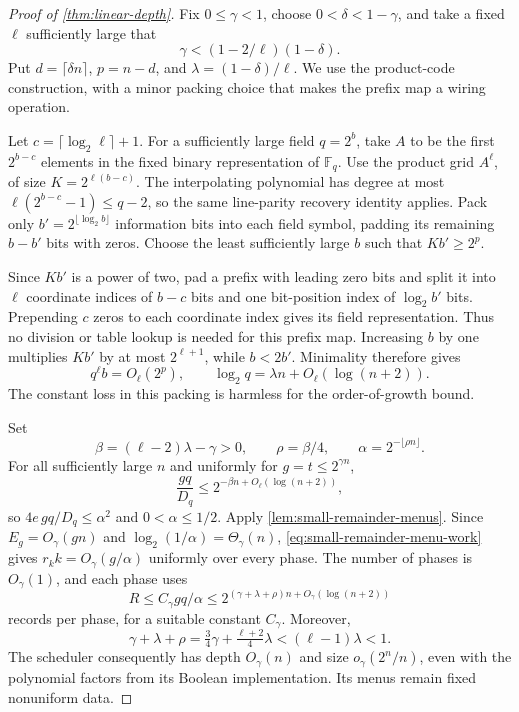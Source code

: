 \documentclass[11pt]{article}
\newcommand{\F}{\mathbb{F}}
\begin{document}
\begin{proof}[Proof of \cref{thm:linear-depth}]
Fix $0\le\gamma<1$, choose $0<\delta<1-\gamma$, and take a fixed
$\ell$ sufficiently large that
\[
  \gamma<(1-2/\ell)(1-\delta).
\]
Put $d=\lceil\delta n\rceil$, $p=n-d$, and
$\lambda=(1-\delta)/\ell$.  We use the product-code construction, with
a minor packing choice that makes the prefix map a wiring operation.

Let $c=\lceil\log_2\ell\rceil+1$.  For a sufficiently large field
$q=2^b$, take $A$ to be the first $2^{b-c}$ elements in the fixed binary
representation of $\F_q$.  Use the product grid $A^\ell$, of size
$K=2^{\ell(b-c)}$.  The interpolating polynomial has degree at most
$\ell(2^{b-c}-1)\le q-2$, so the same line-parity recovery identity
applies.  Pack only $b'=2^{\lfloor\log_2 b\rfloor}$ information bits
into each field symbol, padding its remaining $b-b'$ bits with zeros.
Choose the least sufficiently large $b$ such that $Kb'\ge2^p$.

Since $Kb'$ is a power of two, pad a prefix with leading zero bits
and split it into $\ell$ coordinate indices of $b-c$ bits and one
bit-position index of $\log_2b'$ bits.  Prepending $c$ zeros to each
coordinate index gives its field representation.  Thus no division or
table lookup is needed for this prefix map.
Increasing $b$ by one multiplies $Kb'$ by at most $2^{\ell+1}$, while
$b<2b'$.  Minimality therefore gives
\[
  q^\ell b=O_\ell(2^p),\qquad
  \log_2q=\lambda n+O_\ell(\log(n+2)).
\]
The constant loss in this packing is harmless for the order-of-growth
bound.

Set
\[
  \beta=(\ell-2)\lambda-\gamma>0,\qquad
  \rho=\beta/4,\qquad
  \alpha=2^{-\lfloor\rho n\rfloor}.
\]
For all sufficiently large $n$ and uniformly for $g=t\le2^{\gamma n}$,
\[
  \frac{gq}{D_q}\le2^{-\beta n+O_\ell(\log(n+2))},
\]
so $4e\,gq/D_q\le\alpha^2$ and $0<\alpha\le1/2$.
Apply \cref{lem:small-remainder-menus}.
Since $E_g=O_\gamma(gn)$ and $\log_2(1/\alpha)=\Theta_\gamma(n)$,
\eqref{eq:small-remainder-menu-work} gives $r_k k=O_\gamma(g/\alpha)$
uniformly over every phase.  The number of phases is $O_\gamma(1)$,
and each phase uses
\[
  R\le C_\gamma gq/\alpha
  \le2^{(\gamma+\lambda+\rho)n+O_\gamma(\log(n+2))}
\]
records per phase, for a suitable constant $C_\gamma$.  Moreover,
\[
  \gamma+\lambda+\rho
  =\tfrac34\gamma+\tfrac{\ell+2}{4}\lambda
  <(\ell-1)\lambda<1.
\]
The scheduler consequently has depth $O_\gamma(n)$ and size
$o_\gamma(2^n/n)$, even with the polynomial factors from its
Boolean implementation.  Its menus remain fixed nonuniform data.


\end{proof}
\end{document}

